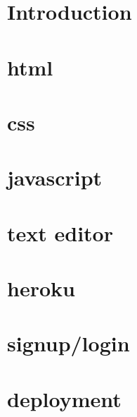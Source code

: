 \documentclass{article}
\renewcommand{\footrulewidth}{0pt}
\begin{document}
\listoffigures
{}
\cleardoublepage


\listoftables
{}
\cleardoublepage




\setcounter{page}{1}%




\section{Introduction}\label{sec:intro}%
\section{html}

\cleardoublepage


\section{css}
\cleardoublepage


\section{javascript}
\cleardoublepage



\section{text editor}
\cleardoublepage



\section{heroku}
\renewcommand{\footrulewidth}{1pt}

\cleardoublepage



\section{signup/login}
\cleardoublepage



\section{deployment}
\cleardoublepage
\end{document}
